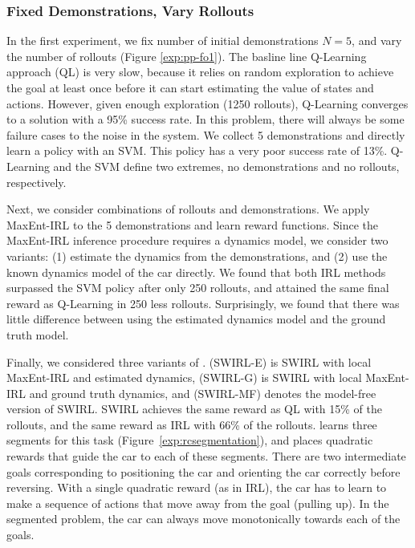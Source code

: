 \subsubsection{Fixed Demonstrations, Vary Rollouts}
In the first experiment, we fix number of initial demonstrations $N=5$, and vary the number of rollouts (Figure \ref{exp:pp-fo1}).
The basline line Q-Learning approach (QL) is very slow, because it relies on random exploration to achieve the goal at least once before it can start estimating the value of states and actions.
However, given enough exploration (1250 rollouts), Q-Learning converges to a solution with a 95\% success rate.
In this problem, there will always be some failure cases to the noise in the system.
We collect 5 demonstrations and directly learn a policy with an SVM.
This policy has a very poor success rate of 13\%.
Q-Learning and the SVM define two extremes, no demonstrations and no rollouts, respectively.

Next, we consider combinations of rollouts and demonstrations.
We apply MaxEnt-IRL to the 5 demonstrations and learn reward functions.
Since the MaxEnt-IRL inference procedure requires a dynamics model, we consider two variants: (1) estimate the dynamics from the demonstrations, and (2) use the known dynamics model of the car directly.
We found that both IRL methods surpassed the SVM policy after only 250 rollouts, and attained the same final reward as Q-Learning in 250 less rollouts.
Surprisingly, we found that there was little difference between using the estimated dynamics model and the ground truth model.

Finally, we considered three variants of \hirl. (SWIRL-E) is SWIRL with local MaxEnt-IRL and estimated dynamics, (SWIRL-G) is SWIRL with local MaxEnt-IRL and ground truth dynamics, and (SWIRL-MF) denotes the model-free version of SWIRL.
SWIRL achieves the same reward as QL with 15\% of the rollouts, and the same reward as IRL with 66\% of the rollouts.
\hirl learns three segments for this task (Figure~\ref{exp:rcsegmentation}), and places quadratic rewards that guide the car to each of these segments.
There are two intermediate goals corresponding to positioning the car and orienting the car correctly before reversing.
With a single quadratic reward (as in IRL), the car has to learn to make a sequence of actions that move away from the goal (pulling up). In the segmented problem, the car can always move monotonically towards each of the goals.


